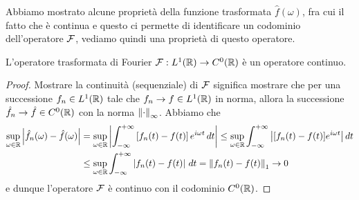 Abbiamo mostrato alcune proprietà della funzione trasformata $ \hat{f}(\omega) $, fra cui il fatto che è continua e questo ci permette di identificare 
un codominio dell'operatore $ \operatorname{\mathcal{F}} $, vediamo quindi una proprietà di questo operatore.

\begin{lemma}
  L'operatore trasformata di Fourier $ \operatorname{\mathcal{F}}: L^1(\mathbb{R}) \to C^0(\mathbb{R}) $ è un operatore continuo.
\end{lemma}
\begin{proof}
  Mostrare la continuità (sequenziale) di $ \operatorname{\mathcal{F}} $ significa mostrare che per una successione $ f_n \in L^1(\mathbb{R}) $ tale che $ f_n \to f \in L^1(\mathbb{R}) $ in 
  norma, allora la successione $ \hat{f}_n \to \hat{f} \in C^0(\mathbb{R}) $ con la norma $ \left\lVert \cdot \right\rVert_\infty $. Abbiamo che 
  \begin{align}
    \sup_{\omega \in \mathbb{R}} \left|{\hat{f}_n(\omega) - \hat{f}(\omega)}\right| 
    &= \sup_{\omega \in \mathbb{R}} \left|{\int_{-\infty}^{+\infty} \left[f_n(t) - f(t) \right]e^{i\omega t} \,dt}\right|
    \leq \sup_{\omega \in \mathbb{R}} \int_{-\infty}^{+\infty} \left|{[f_n(t) - f(t) ]e^{i\omega t}}\right|dt
    \\
    &\leq \sup_{\omega \in \mathbb{R}} {\int_{-\infty}^{+\infty} \left|{f_n(t) - f(t)}\right| \,dt } = \left\lVert f_n(t) - f(t) \right\rVert_1 \to 0
  \end{align}
  e dunque l'operatore $ \operatorname{\mathcal{F}} $ è continuo con il codominio $ C^0(\mathbb{R}) $.
\end{proof}

